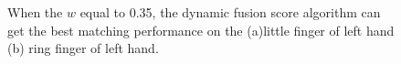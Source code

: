 \begin{figure}[ht!]
    \centering

    \caption{When the $w$ equal to 0.35, the dynamic fusion score algorithm can get the best matching performance on the (a)little finger of left hand (b) ring finger of left hand. }
    \label{dynamic-score}
\end{figure}

